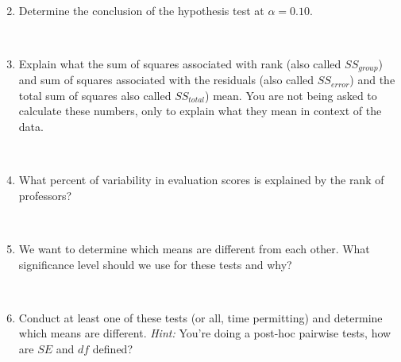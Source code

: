 \documentclass[11pt]{article}
\newcommand{\soln}[2]{$\:$\\ \vspace{#1}}{}
\begin{document}
\begin{enumerate}
\soln{2cm}
{
\begin{itemize}
\item Df: $df_G = 3 - 1 = 2$, $df_T = (102 + 108 + 253) - 1 = 462$, $df_E = 462 - 2 = 460$ \\
\item SS: $SS_E = 136.66 - 1.59 = 135.07$ \\
\item MS: $MS_G = 1.59 / 2 = 0.795$, $MS_E = 135.07 / 462 = 0.29$ \\
\item F = 0.795 / 0.29 = 2.74 \\
\item p-value = \texttt{pf(2.74, df1 = 2, df2 = 462, lower.tail = FALSE)} = 0.065
\end{itemize}
}

\item Determine the conclusion of the hypothesis test at $\alpha = 0.10$.

\soln{3cm}
{
Reject $H_0$. At least one pair of means are different from each other.
}

\item Explain what the sum of squares associated with rank (also called $SS_{group}$) and sum of squares 
associated with the residuals (also called $SS_{error}$) and the total sum of squares also called $SS_{total}$) mean. You are not being 
asked to calculate these numbers, only to explain what they mean in context of the data.

\soln{5cm}
{
$SS_G$: Variability between groups \\
$SS_E$: Variability within groups \\
$SS_T$: Total variability in evaluation scores
}

\pagebreak

\item What percent of variability in evaluation scores is explained by the rank of professors?

\soln{3cm}
{$SS_G / SS_T = 1.59 / 136.66 = 0.0116 \rightarrow 1.16\%$}

\item We want to determine which means are different from each other. What significance level should we use 
for these tests and why?

\soln{3cm}
{
$\alpha^\star = 0.10 / 3 = 0.033$
}

\item Conduct at least one of these tests (or all, time permitting) and determine which means are different.
\textit{Hint:} You're doing a post-hoc pairwise tests, how are $SE$ and $df$ defined?

\soln{3cm}
{Do t tests where variance is MSE and df is $df_E$ for all tests}

\end{enumerate}

\end{document}
